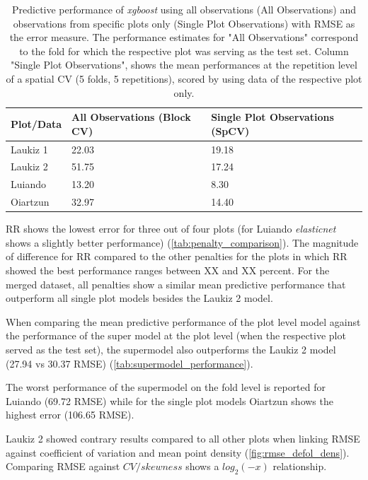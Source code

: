 \documentclass[review]{elsarticle}
\begin{document}
\begin{table}[b!]
\centering
\caption[t]{Predictive performance of \textit{xgboost} using all observations (All Observations) and observations from specific plots only (Single Plot Observations) with \ac{RMSE} as the error measure. The performance estimates for "All Observations" correspond to the fold for which the respective plot was serving as the test set. Column "Single Plot Observations", shows the mean performances at the repetition level of a spatial CV (5 folds, 5 repetitions), scored by using data of the respective plot only.}
\begingroup\footnotesize
\begin{tabular}{lll}
	\\
	Plot/Data & All Observations (Block CV) & Single Plot Observations (SpCV) \\
	\hline
	Laukiz 1  & 22.03                       & 19.18                               \\
	Laukiz 2  & 51.75                       & 17.24      \\
	Luiando   & 13.20                       & 8.30                             \\
	Oiartzun  & 32.97                       & 14.40      \\
	\bottomrule
\end{tabular}
\endgroup
\label{tab:supermodel_performance}
\end{table}

\ac{RR} shows the lowest error for three out of four plots (for Luiando \textit{elasticnet} shows a slightly better performance) (\autoref{tab:penalty_comparison}).
The magnitude of difference for \ac{RR} compared to the other penalties for the plots in which \ac{RR} showed the best performance ranges between XX and XX percent.
For the merged dataset, all penalties show a similar mean predictive performance that outperform all single plot models besides the Laukiz 2 model.

When comparing the mean predictive performance of the plot level model against the performance of the super model at the plot level (when the respective plot served as the test set), the supermodel also outperforms the Laukiz 2 model (27.94 vs 30.37 RMSE) (\autoref{tab:supermodel_performance}).

The worst performance of the supermodel on the fold level is reported for Luiando (69.72 RMSE) while for the single plot models Oiartzun shows the highest error (106.65 RMSE).

Laukiz 2 showed contrary results compared to all other plots when linking \ac{RMSE} against coefficient of variation and mean point density (\autoref{fig:rmse_defol_dens}).
Comparing RMSE against $CV/skewness$ shows a $log_{2}(-x)$ relationship.
\end{document}
